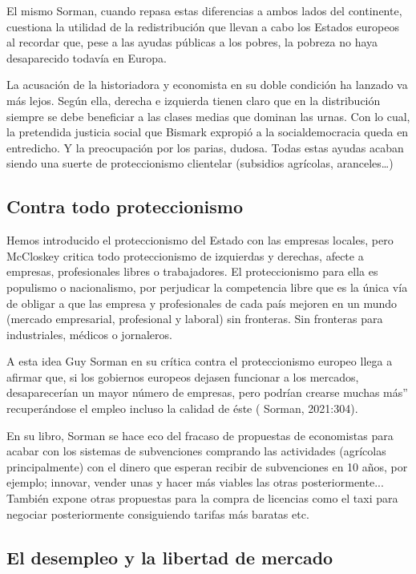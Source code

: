 \documentclass[
]{article}
\begin{document}
El mismo Sorman, cuando repasa estas diferencias a ambos lados del
continente, cuestiona la utilidad de la redistribución que llevan a cabo
los Estados europeos al recordar que, pese a las ayudas públicas a los
pobres, la pobreza no haya desaparecido todavía en Europa.

La acusación de la historiadora y economista en su doble condición ha
lanzado va más lejos. Según ella, derecha e izquierda tienen claro que
en la distribución siempre se debe beneficiar a las clases medias que
dominan las urnas. Con lo cual, la pretendida justicia social que
Bismark expropió a la socialdemocracia queda en entredicho. Y la
preocupación por los parias, dudosa. Todas estas ayudas acaban siendo
una suerte de proteccionismo clientelar (subsidios agrícolas,
aranceles\ldots)

\hypertarget{contra-todo-proteccionismo}{%
\subsection{Contra todo
proteccionismo}\label{contra-todo-proteccionismo}}

Hemos introducido el proteccionismo del Estado con las empresas locales,
pero McCloskey critica todo proteccionismo de izquierdas y derechas,
afecte a empresas, profesionales libres o trabajadores. El
proteccionismo para ella es populismo o nacionalismo, por perjudicar la
competencia libre que es la única vía de obligar a que las empresa y
profesionales de cada país mejoren en un mundo (mercado empresarial,
profesional y laboral) sin fronteras. Sin fronteras para industriales,
médicos o jornaleros.

A esta idea Guy Sorman en su crítica contra el proteccionismo europeo
llega a afirmar que, si los gobiernos europeos dejasen funcionar a los
mercados, desaparecerían un mayor número de empresas, pero podrían
crearse muchas más'' recuperándose el empleo incluso la calidad de éste
( Sorman, 2021:304).

En su libro, Sorman se hace eco del fracaso de propuestas de economistas
para acabar con los sistemas de subvenciones comprando las actividades
(agrícolas principalmente) con el dinero que esperan recibir de
subvenciones en 10 años, por ejemplo; innovar, vender unas y hacer más
viables las otras posteriormente... También expone otras propuestas para
la compra de licencias como el taxi para negociar posteriormente
consiguiendo tarifas más baratas etc.

\hypertarget{el-desempleo-y-la-libertad-de-mercado}{%
\subsection{El desempleo y la libertad de
mercado}\label{el-desempleo-y-la-libertad-de-mercado}}
\end{document}
